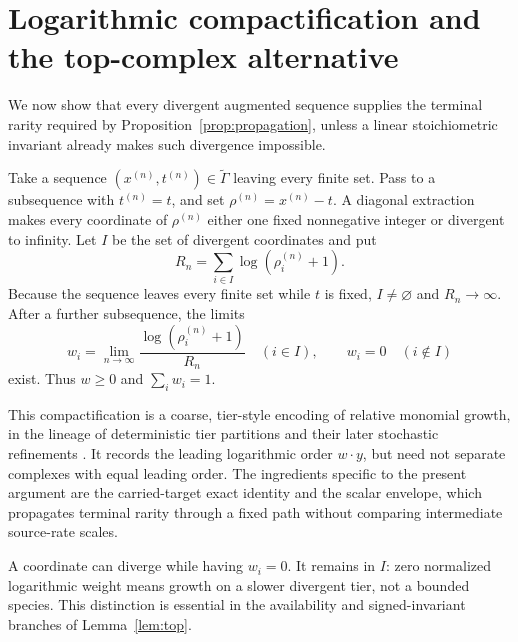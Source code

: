 \section{Logarithmic compactification and the top-complex alternative}
\label{sec:compact}

We now show that every divergent augmented sequence supplies the terminal
rarity required by Proposition~\ref{prop:propagation}, unless a linear
stoichiometric invariant already makes such divergence impossible.

Take a sequence \((x^{(n)},t^{(n)})\in\widetilde\Gamma\) leaving every finite
set.  Pass to a subsequence with \(t^{(n)}=t\), and set
\(\rho^{(n)}=x^{(n)}-t\).  A diagonal extraction makes every coordinate of
\(\rho^{(n)}\) either one fixed nonnegative integer or divergent to infinity.
Let \(I\) be the set of divergent coordinates and put
\begin{equation}\label{eq:Rn}
  R_n=\sum_{i\in I}\log(\rho_i^{(n)}+1).
\end{equation}
Because the sequence leaves every finite set while \(t\) is fixed,
\(I\ne\varnothing\) and \(R_n\to\infty\).
After a further subsequence, the limits
\begin{equation}\label{eq:weights}
  w_i=\lim_{n\to\infty}
  \frac{\log(\rho_i^{(n)}+1)}{R_n}
  \quad(i\in I),
  \qquad w_i=0\quad(i\notin I)
\end{equation}
exist.  Thus \(w\ge0\) and \(\sum_iw_i=1\).

This compactification is a coarse, tier-style encoding of relative monomial
growth, in the lineage of deterministic tier partitions and their later
stochastic refinements
\citep{Anderson2011Boundedness,Anderson2011GlobalAttractor,
AndersonKim2018,AndersonCappellettiKim2020,
AndersonCappellettiKimNguyen2020}.
It records the leading logarithmic order \(w\cdot y\), but need not separate
complexes with equal leading order.  The ingredients specific to the present
argument are the carried-target exact identity and the scalar envelope, which
propagates terminal rarity through a fixed path without comparing intermediate
source-rate scales.

\begin{remark}\label{rem:zero-weight}
A coordinate can diverge while having \(w_i=0\).  It remains in \(I\): zero
normalized logarithmic weight means growth on a slower divergent tier, not a
bounded species.  This distinction is essential in the availability and
signed-invariant branches of Lemma~\ref{lem:top}.
\end{remark}


